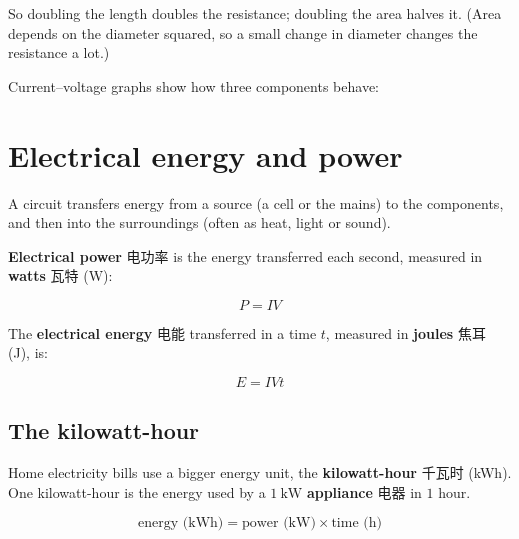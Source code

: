 \documentclass[11pt]{article}
\begin{document}
So doubling the length doubles the resistance; doubling the area halves it. (Area depends on the diameter squared, so a small change in diameter changes the resistance a lot.)

Current–voltage graphs show how three components behave:

\begin{center}
\end{center}

\section*{Electrical energy and power}

A circuit transfers energy from a source (a cell or the mains) to the components, and then into the surroundings (often as heat, light or sound).

\textbf{Electrical power} 电功率 is the energy transferred each second, measured in \textbf{watts} 瓦特 (W):

\[
P = IV
\]

The \textbf{electrical energy} 电能 transferred in a time $t$, measured in \textbf{joules} 焦耳 (J), is:

\[
E = IVt
\]

\subsection*{The kilowatt-hour}

Home electricity bills use a bigger energy unit, the \textbf{kilowatt-hour} 千瓦时 (kWh). One kilowatt-hour is the energy used by a $1\ \text{kW}$ \textbf{appliance} 电器 in $1$ hour.

\[
\text{energy (kWh)} = \text{power (kW)} \times \text{time (h)}
\]
\end{document}
